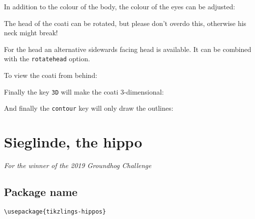 \documentclass[parskip=half]{scrartcl}
\begin{document}
In addition to the colour of the body, the colour of the eyes can be adjusted:
\begin{tcblisting}{}
\coati[eye=red]
\end{tcblisting}

The head of the coati can be rotated, but please don't overdo this, otherwise his neck might break!
\begin{tcblisting}{}
\coati[rotatehead=-15]
\end{tcblisting}

For the head an alternative sidewards facing head is available. It can be combined with the \lstinline|rotatehead| option.
\begin{tcblisting}{}
\coati[sideward]
\end{tcblisting}

To view the coati from behind:
\begin{tcblisting}{}
\coati[back]
\end{tcblisting}

Finally the key \lstinline|3D| will make the coati 3-dimensional:
\begin{tcblisting}{}
\coati[3D]
\end{tcblisting}

And finally the \lstinline|contour| key will only draw the outlines:
\begin{tcblisting}{}
\coati[contour=black]
\end{tcblisting}

%
%
\clearpage
\section[Hippo]{Sieglinde, the hippo}

\emph{For the winner of the 2019 Groundhog Challenge}

\subsection{Package name}

\begin{tcolorbox}[lower separated=false, lefthand width=.8\linewidth]
\vspace*{0.5cm}
\lstinline|\usepackage{tikzlings-hippos}| 
\vspace*{0.5cm}
\end{tcolorbox}
\end{document}
